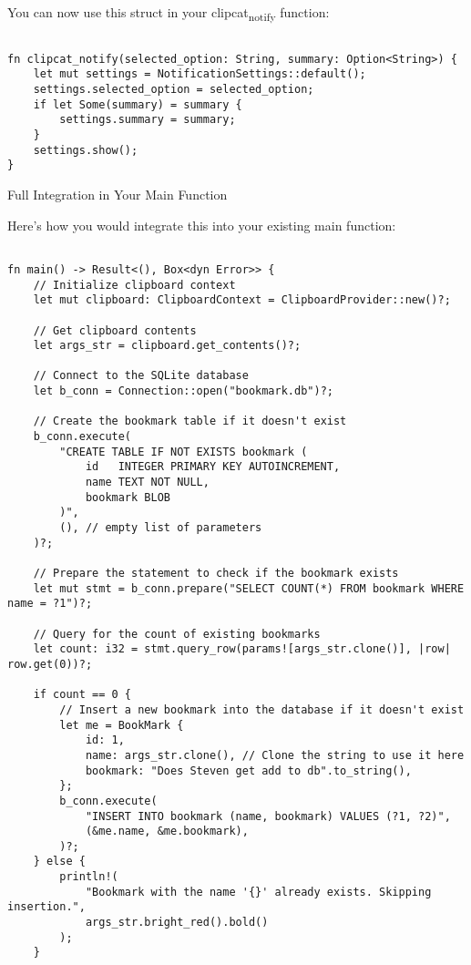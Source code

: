 \documentclass[11pt]{article}
\begin{document}
You can now use this struct in your clipcat\textsubscript{notify} function:

\begin{verbatim}

fn clipcat_notify(selected_option: String, summary: Option<String>) {
    let mut settings = NotificationSettings::default();
    settings.selected_option = selected_option;
    if let Some(summary) = summary {
        settings.summary = summary;
    }
    settings.show();
}

\end{verbatim}
Full Integration in Your Main Function

Here's how you would integrate this into your existing main function:

\begin{verbatim}

fn main() -> Result<(), Box<dyn Error>> {
    // Initialize clipboard context
    let mut clipboard: ClipboardContext = ClipboardProvider::new()?;

    // Get clipboard contents
    let args_str = clipboard.get_contents()?;

    // Connect to the SQLite database
    let b_conn = Connection::open("bookmark.db")?;

    // Create the bookmark table if it doesn't exist
    b_conn.execute(
        "CREATE TABLE IF NOT EXISTS bookmark (
            id   INTEGER PRIMARY KEY AUTOINCREMENT,
            name TEXT NOT NULL,
            bookmark BLOB
        )",
        (), // empty list of parameters
    )?;

    // Prepare the statement to check if the bookmark exists
    let mut stmt = b_conn.prepare("SELECT COUNT(*) FROM bookmark WHERE name = ?1")?;

    // Query for the count of existing bookmarks
    let count: i32 = stmt.query_row(params![args_str.clone()], |row| row.get(0))?;

    if count == 0 {
        // Insert a new bookmark into the database if it doesn't exist
        let me = BookMark {
            id: 1,
            name: args_str.clone(), // Clone the string to use it here
            bookmark: "Does Steven get add to db".to_string(),
        };
        b_conn.execute(
            "INSERT INTO bookmark (name, bookmark) VALUES (?1, ?2)",
            (&me.name, &me.bookmark),
        )?;
    } else {
        println!(
            "Bookmark with the name '{}' already exists. Skipping insertion.",
            args_str.bright_red().bold()
        );
    }


\end{verbatim}
\end{document}
